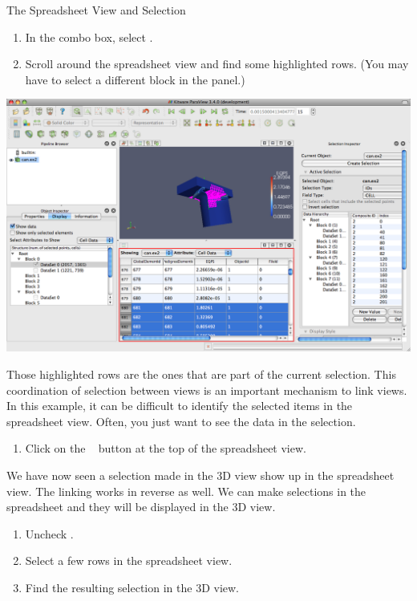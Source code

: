 \begin{exercise}{The Spreadsheet View and Selection}
  \begin{enumerate}
    \restorecounter
  \item In the  combo box, select .
  \item Scroll around the spreadsheet view and find some highlighted rows.
    (You may have to select a different block in the  panel.)
    \savecounter
  \end{enumerate}

  \begin{inlinefig}
    \includegraphics[width=\scw]{images/SpreadsheetViewExample}
  \end{inlinefig}

  Those highlighted rows are the ones that are part of the current
  selection.  This coordination of selection between views is an important
  mechanism to link views.  In this example, it can be difficult to identify
  the selected items in the spreadsheet view.  Often, you just want to see
  the data in the selection.

  \begin{enumerate}
    \restorecounter
  \item Click on the ~
    button at the top of the spreadsheet view.
    \savecounter
  \end{enumerate}

  We have now seen a selection made in the 3D view show up in the
  spreadsheet view.  The linking works in reverse as well.  We can make
  selections in the spreadsheet and they will be displayed in the 3D view.

  \begin{enumerate}
  \item Uncheck .
  \item Select a few rows in the spreadsheet view.
  \item Find the resulting selection in the 3D view.
  \end{enumerate}
\end{exercise}

